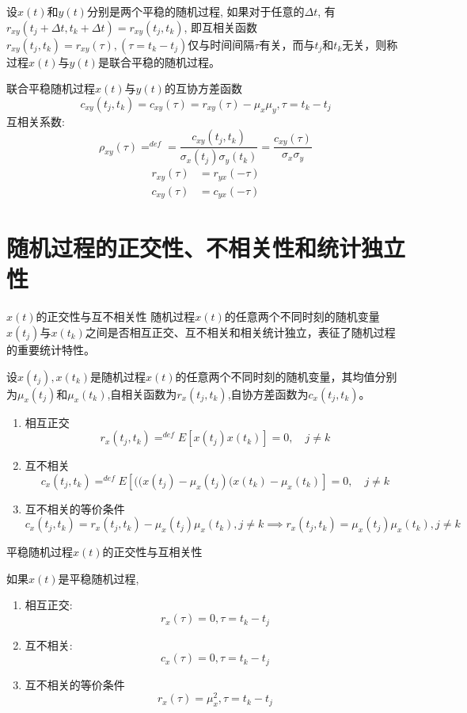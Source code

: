 \begin{frame}
\begin{definition}[联合平稳随机过程]
设$x(t)$和$y(t)$分别是两个平稳的随机过程, 如果对于任意的$\Delta t$, 有$r_{xy}(t_j+\Delta t,t_k+\Delta t)=r_{xy}(t_j,t_k)$, 即互相关函数$r_{xy}(t_j,t_k)=r_{xy}(\tau),(\tau=t_k-t_j)$仅与时间间隔$\tau$有关，而与$t_j$和$t_k$无关，则称过程$x(t)$与$y(t)$是联合平稳的随机过程。
\end{definition}
\begin{block}{联合平稳随机过程$x(t)$与$y(t)$的互协方差函数}
\[c_{xy}(t_j,t_k)=c_{xy}(\tau)=r_{xy}(\tau)-\mu_x\mu_y, \tau=t_k-t_j\]
互相关系数:
\[\rho_{xy}(\tau)\mathop{=}^{def}=\frac{c_{xy}(t_j,t_k)}{\sigma_x(t_j)\sigma_y(t_k)}=\frac{c_{xy}(\tau)}{\sigma_x\sigma_y}\]
\begin{align*}
r_{xy}(\tau)&=r_{yx}(-\tau)\\
c_{xy}(\tau)&=c_{yx}(-\tau)
\end{align*}
\end{block}
\end{frame}

\section{随机过程的正交性、不相关性和统计独立性}

\begin{frame}{$x(t)$的正交性与互不相关性}
随机过程$x(t)$的任意两个不同时刻的随机变量$x(t_j)$与$x(t_k)$之间是否相互正交、互不相关和相关统计独立，表征了随机过程的重要统计特性。
\begin{definition}
	设$x(t_j),x(t_k)$是随机过程$x(t)$的任意两个不同时刻的随机变量，其均值分别为$\mu_x(t_j)$和$\mu_x(t_k)$,自相关函数为$r_x(t_j,t_k)$,自协方差函数为$c_x(t_j,t_k)$。
	\begin{enumerate}
		\item 相互正交
		$$r_x(t_j,t_k)\mathop{=}^{def}E[x(t_j)x(t_k)]=0, \quad j\ne k$$
		\item 互不相关
		$$c_x(t_j,t_k)\mathop{=}^{def}E[((x(t_j)-\mu_x(t_j)(x(t_k)-\mu_x(t_k)]=0, \quad j\ne k$$
		\item 互不相关的等价条件
		$$c_x(t_j,t_k)=r_x(t_j,t_k)-\mu_x(t_j)\mu_x(t_k), j\ne k \implies r_x(t_j,t_k)=\mu_x(t_j)\mu_x(t_k),j\ne k $$
	\end{enumerate}
	
\end{definition}
\end{frame}

\begin{frame}{平稳随机过程$x(t)$的正交性与互相关性}
\begin{definition}[]
如果$x(t)$是平稳随机过程,
\begin{enumerate}
	\item 相互正交:
	\[r_x(\tau)=0,\tau=t_k-t_j\]
	\item 互不相关:
	\[c_x(\tau)=0,\tau=t_k-t_j\]
	\item
	互不相关的等价条件
	\[r_x(\tau)=\mu_x^2,\tau=t_k-t_j\]
\end{enumerate}
\end{definition}
\end{frame}

